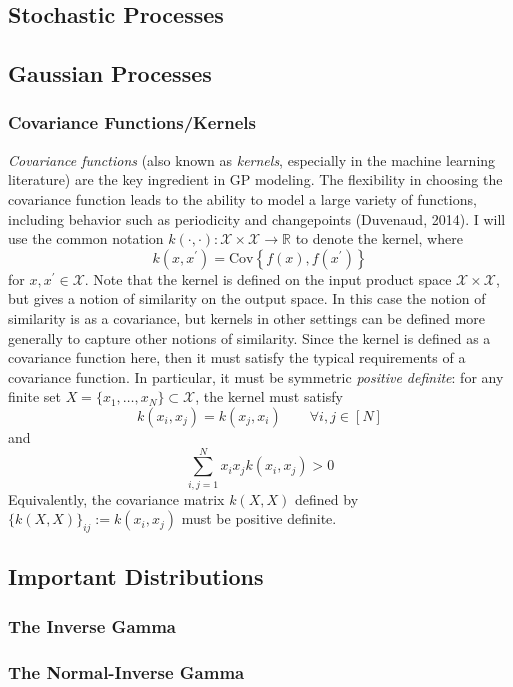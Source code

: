 \documentclass[12pt]{article}
\newcommand{\R}{\mathcal{R}}
\newcommand{\Cov}{\mathrm{Cov}}
\def\R{\mathbb{R}}
\begin{document}
\subsection{Stochastic Processes}

\subsection{Gaussian Processes}
\subsubsection{Covariance Functions/Kernels}
\textit{Covariance functions} (also known as \textit{kernels}, especially in the machine learning literature) are the key ingredient in GP modeling. The flexibility in choosing the covariance 
function leads to the ability to model a large variety of functions, including behavior such as periodicity and changepoints (Duvenaud, 2014). I will use the common notation 
$k(\cdot, \cdot): \mathcal{X} \times \mathcal{X} \to \R$ to denote the kernel, where 
\[k(x, x^\prime) = \Cov\left\{f(x), f(x^\prime)\right\}\] 
for $x, x^\prime \in \mathcal{X}$. Note that the kernel is defined on the input product space $\mathcal{X} \times \mathcal{X}$, but gives a notion of similarity on the output space. In this case
the notion of similarity is as a covariance, but kernels in other settings can be defined more generally to capture other notions of similarity. Since the kernel is defined as a covariance function
here, then it must satisfy the typical requirements of a covariance function. In particular, it must be symmetric \textit{positive definite}: for any finite set $X = \{x_1, \dots, x_N\} \subset \mathcal{X}$, the 
kernel must satisfy
\[k(x_i, x_j) = k(x_j, x_i) \qquad \forall i, j \in [N]\]
and
\[\sum_{i, j = 1}^N x_i x_j k(x_i, x_j) > 0\]
Equivalently, the covariance matrix $k(X, X)$ defined by $\{k(X, X)\}_{ij} := k(x_i, x_j)$ must be positive definite. 



\subsection{Important Distributions}
\subsubsection{The Inverse Gamma}

\subsubsection{The Normal-Inverse Gamma}
\end{document}
